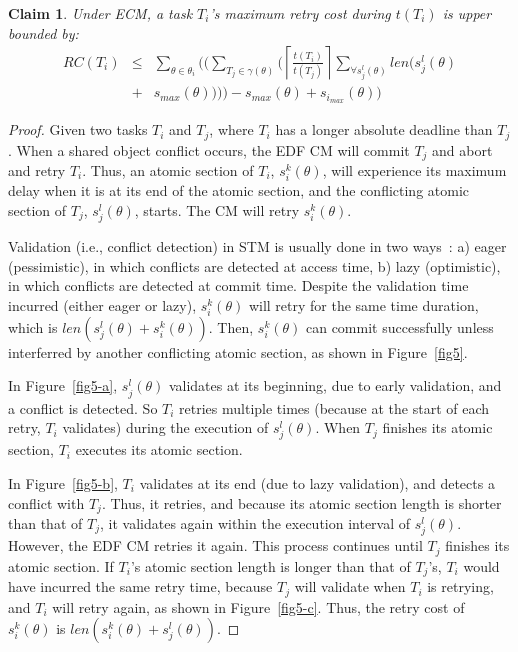 \documentclass{sig-alternate}
\newtheorem{clm}{Claim}
\begin{document}
\begin{clm}\label{gedf-edf}
Under ECM, a task $T_i$'s maximum retry cost during $t(T_i)$ is upper bounded by:
\begin{eqnarray}
RC\left(T_{i}\right) & \le & \sum_{\theta\in\theta_{i}}\Big(\Big(\sum_{T_{j}\in\gamma(\theta)}\Big(\left\lceil\frac{t\left(T_{i}\right)}{t\left(T_{j}\right)}\right\rceil\sum_{\forall s_{j}^{l}(\theta)}len\big(s_{j}^{l}(\theta)\nonumber \\
 & + & s_{max}(\theta)\big)\Big)\Big)-s_{max}(\theta)+s_{i_{max}}(\theta)\Big)\label{eq3}\end{eqnarray}
\end{clm}
\begin{proof}
Given two tasks $T_{i}$ and $T_{j}$, where $T_{i}$ has a longer absolute deadline than $T_{j}$. When a shared object conflict occurs, the EDF CM will commit $T_{j}$ and abort and retry $T_{i}$.
Thus, an atomic section of $T_{i}$, $s_{i}^{k}(\theta)$,
will experience its maximum delay when it is at its end of the atomic section, 
and the conflicting atomic section of $T_{j}$, $s_{j}^{l}(\theta)$, starts. 
The CM will retry $s_{i}^{k}(\theta)$. 

Validation (i.e., conflict detection) in STM is usually done in two ways~\cite{austenmc:tcc:dissertation:2009}: a) eager (pessimistic), in which conflicts are detected at access time, b) lazy (optimistic), in which conflicts are detected at commit time. Despite the validation time incurred (either eager or lazy),  
$s_{i}^{k}(\theta)$ will retry for the same time duration, which is $len(s_{j}^{l}(\theta)+s_i^k(\theta))$. Then, $s_i^k(\theta)$ can commit successfully  
unless interferred by another conflicting atomic section, as shown in Figure~\ref{fig5}. 

In Figure~\ref{fig5-a}, $s_{j}^{l}(\theta)$
validates at its beginning, due to early validation, and a conflict
is detected. So $T_{i}$ retries multiple times (because at the start of each retry, $T_{i}$ validates) 
during the execution of $s_{j}^{l}(\theta)$.
When $T_{j}$ finishes its atomic section, $T_{i}$ executes its atomic section. 

In Figure~\ref{fig5-b}, 
$T_{i}$ validates at its end (due to lazy validation), and detects a conflict with $T_{j}$.
Thus, it retries, and because its atomic section length is shorter
than that of $T_{j}$, it validates again within the execution
interval of $s_{j}^{l}(\theta)$. However, the EDF CM retries it again.
This process continues until $T_{j}$ finishes its atomic section.
If $T_{i}$'s atomic section length is longer than that of $T_{j}$'s,
$T_{i}$ would have incurred the same retry time, because
$T_{j}$ will validate when $T_{i}$ is retrying, and $T_{i}$ will
retry again, as shown in Figure~\ref{fig5-c}. Thus, the retry cost
of $s_{i}^{k}(\theta)$ is $len(s_{i}^{k}(\theta)+s_{j}^{l}(\theta))$.


\end{proof}
\end{document}
